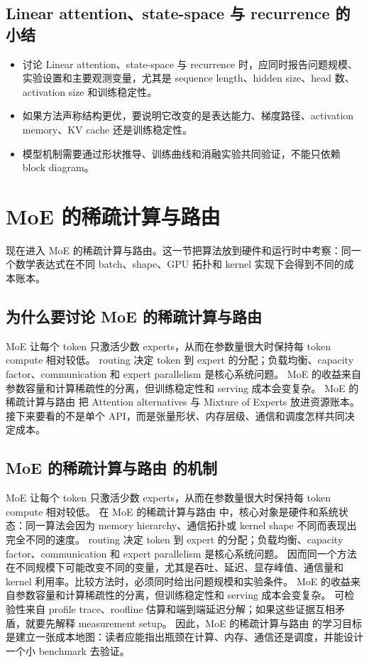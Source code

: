 \documentclass[a4paper]{article}
\begin{document}
\subsection{Linear attention、state-space 与 recurrence 的小结}
\begin{itemize}
\item 讨论 Linear attention、state-space 与 recurrence 时，应同时报告问题规模、实验设置和主要观测变量，尤其是 sequence length、hidden size、head 数、activation size 和训练稳定性。
\item 如果方法声称结构更优，要说明它改变的是表达能力、梯度路径、activation memory、KV cache 还是训练稳定性。
\item 模型机制需要通过形状推导、训练曲线和消融实验共同验证，不能只依赖 block diagram。
\end{itemize}
\section{MoE 的稀疏计算与路由}
现在进入 MoE 的稀疏计算与路由。这一节把算法放到硬件和运行时中考察：同一个数学表达式在不同 batch、shape、GPU 拓扑和 kernel 实现下会得到不同的成本账本。
\subsection{为什么要讨论 MoE 的稀疏计算与路由}
MoE 让每个 token 只激活少数 experts，从而在参数量很大时保持每 token compute 相对较低。
routing 决定 token 到 expert 的分配；负载均衡、capacity factor、communication 和 expert parallelism 是核心系统问题。
MoE 的收益来自参数容量和计算稀疏性的分离，但训练稳定性和 serving 成本会变复杂。
MoE 的稀疏计算与路由 把 Attention alternatives 与 Mixture of Experts 放进资源账本。接下来要看的不是单个 API，而是张量形状、内存层级、通信和调度怎样共同决定成本。
\subsection{MoE 的稀疏计算与路由 的机制}
MoE 让每个 token 只激活少数 experts，从而在参数量很大时保持每 token compute 相对较低。 在 MoE 的稀疏计算与路由 中，核心对象是硬件和系统状态：同一算法会因为 memory hierarchy、通信拓扑或 kernel shape 不同而表现出完全不同的速度。
routing 决定 token 到 expert 的分配；负载均衡、capacity factor、communication 和 expert parallelism 是核心系统问题。 因而同一个方法在不同规模下可能改变不同的变量，尤其是吞吐、延迟、显存峰值、通信量和 kernel 利用率。比较方法时，必须同时给出问题规模和实验条件。
MoE 的收益来自参数容量和计算稀疏性的分离，但训练稳定性和 serving 成本会变复杂。 可检验性来自 profile trace、roofline 估算和端到端延迟分解；如果这些证据互相矛盾，就要先解释 measurement setup。
因此，MoE 的稀疏计算与路由 的学习目标是建立一张成本地图：读者应能指出瓶颈在计算、内存、通信还是调度，并能设计一个小 benchmark 去验证。
\end{document}
